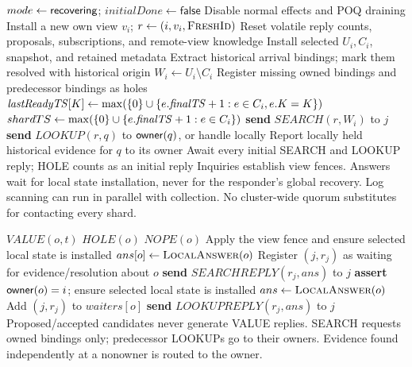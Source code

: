 \begin{algorithm}[p]
\caption{Install state and begin collection}
\begin{algorithmic}[1]
  \State $mode\gets\mathsf{recovering}$; $initialDone\gets\mathsf{false}$
  \State Disable normal effects and POQ draining
  \State Install a new own view $v_i$; $r\gets(i,v_i,\Call{FreshId}{})$
  \State Reset volatile reply counts, proposals, subscriptions, and remote-view knowledge
  \State Install selected $U_i,C_i$, snapshot, and retained metadata
  \State Extract historical arrival bindings; mark them resolved with historical origin
  \State $W_i\gets U_i\setminus C_i$
  \State Register missing owned bindings and predecessor bindings as holes
    \State $\mathit{lastReadyTS}[K]\gets\max(\{0\}\cup\{e.\mathit{finalTS}+1:e\in C_i,e.K=K\})$
  \EndFor
  \State $shardTS\gets\max(\{0\}\cup\{e.\mathit{finalTS}+1:e\in C_i\})$
    \State \textbf{send} $SEARCH(r,W_i)$ to $j$
  \EndFor
    \State \textbf{send} $LOOKUP(r,q)$ to $\mathsf{owner}(q)$, or handle locally
    \State Report locally held historical evidence for $q$ to its owner
  \EndFor
  \State Await every initial SEARCH and LOOKUP reply; HOLE counts as an initial reply
\EndProcedure
\Statex Inquiries establish view fences. Answers wait for local state installation,
\Statex never for the responder's global recovery. Log scanning can run in parallel
\Statex with collection. No cluster-wide quorum substitutes for contacting every shard.
\end{algorithmic}
\end{algorithm}

\begin{algorithm}[p]
\caption{Immediate local answers and subscriptions}
\begin{algorithmic}[1]
    \State \Return $VALUE(o,t)$
    \State \Return $HOLE(o)$
  \Else
    \State \Return $NOPE(o)$
  \EndIf
\EndFunction
\Statex
{}
  \State Apply the view fence and ensure selected local state is installed
    \State $ans[o]\gets\Call{LocalAnswer}{o}$
      \State Register $(j,r_j)$ as waiting for evidence/resolution about $o$
    \EndIf
  \EndFor
  \State \textbf{send} $SEARCHREPLY(r_j,ans)$ to $j$
\EndProcedure
\Statex
{}
  \State \textbf{assert} $\mathsf{owner}(o)=i$; ensure selected local state is installed
  \State $ans\gets\Call{LocalAnswer}{o}$
    \State Add $(j,r_j)$ to $waiters[o]$
  \EndIf
  \State \textbf{send} $LOOKUPREPLY(r_j,ans)$ to $j$
\EndProcedure
\Statex Proposed/accepted candidates never generate VALUE replies.
\Statex SEARCH requests owned bindings only; predecessor LOOKUPs go to their owners.
\Statex Evidence found independently at a nonowner is routed to the owner.
\end{algorithmic}
\end{algorithm}


